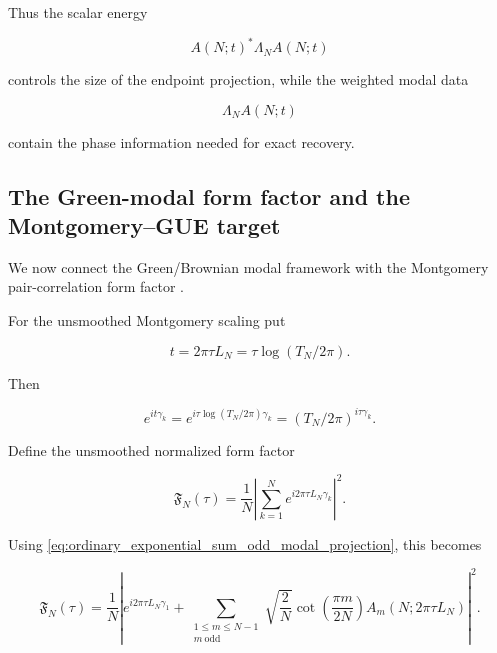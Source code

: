\documentclass[11pt]{amsart}
\numberwithin{equation}{section}
\theoremstyle{plain}
\theoremstyle{definition}
\theoremstyle{remark}
\begin{document}
Thus the scalar energy

\begin{equation}
A(N;t)^*\Lambda_NA(N;t)
\end{equation}

controls the size of the endpoint projection, while the weighted modal
data

\begin{equation}
\Lambda_NA(N;t)
\end{equation}

contain the phase information needed for exact recovery.

\subsection{The Green-modal form factor and the Montgomery--GUE target}
\label{subsec:green_modal_form_factor_montgomery_gue_target}

We now connect the Green/Brownian modal framework with the Montgomery
pair-correlation form factor \cite{Montgomery1973}.

For the unsmoothed Montgomery scaling put

\begin{equation}
t=2\pi\tau L_N=\tau\log(T_N/2\pi).
\label{eq:montgomery_scaling_t_tau}
\end{equation}

Then

\begin{equation}
e^{it\gamma_k}
=
e^{i\tau\log(T_N/2\pi)\gamma_k}
=
(T_N/2\pi)^{i\tau\gamma_k}.
\label{eq:montgomery_scaling_phase}
\end{equation}

Define the unsmoothed normalized form factor

\begin{equation}
\mathfrak F_N(\tau)
=
\frac1N
\left|
\sum_{k=1}^{N}
e^{i2\pi\tau L_N\gamma_k}
\right|^2.
\label{eq:unsmoothed_normalized_form_factor}
\end{equation}

Using \eqref{eq:ordinary_exponential_sum_odd_modal_projection}, this
becomes

\begin{equation}
\mathfrak F_N(\tau)
=
\frac1N
\left|
e^{i2\pi\tau L_N\gamma_1}
+
\sum_{\substack{1\le m\le N-1\\ m\ \mathrm{odd}}}
\sqrt{\frac2N}
\cot\left(\frac{\pi m}{2N}\right)
A_m(N;2\pi\tau L_N)
\right|^2.
\label{eq:unsmoothed_form_factor_modal_projection}
\end{equation}
\end{document}
